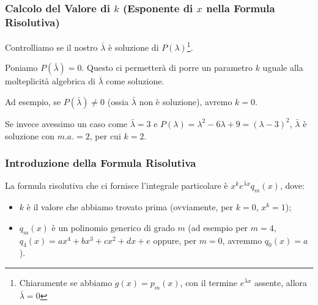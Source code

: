 \documentclass[a4paper,11pt]{article}
\begin{document}
\subsubsection[\texorpdfstring{Calcolo della $k$ di $x^k$}{Calcolo di k da Formula Risolutiva}]{Calcolo del Valore di $k$ (Esponente di $x$ nella Formula Risolutiva)}
Controlliamo se il nostro $\bar{\lambda}$ è soluzione di $P(\lambda)$\footnote[1]{Chiaramente se abbiamo $g(x)=p_m(x)$, con il termine $e^{\bar{\lambda}x}$ assente, allora $\bar{\lambda}=0$}.

\noindent Poniamo $P(\bar{\lambda})=0$. Questo ci permetterà di porre un parametro $k$ uguale alla molteplicità algebrica di $\bar{\lambda}$ come soluzione.

\noindent Ad esempio, se $P(\bar{\lambda})\neq 0$ (ossia $\bar{\lambda}$ non è soluzione), avremo $k=0$.

\noindent Se invece avessimo un caso come $\bar{\lambda}=3$ e $P(\lambda)=\lambda^2-6\lambda+9=(\lambda-3)^2$, $\bar{\lambda}$ è soluzione con $m.a.=2$, per cui $k=2$.

\subsubsection[Formula Risolutiva]{Introduzione della Formula Risolutiva}
La formula risolutiva che ci fornisce l'integrale particolare è $x^k e^{\bar{\lambda} x}q_m(x)$, dove:
\begin{itemize}
    \item $k$ è il valore che abbiamo trovato prima (ovviamente, per $k=0$, $x^k=1$);
    \item $q_m(x)$ è un polinomio generico di grado $m$ (ad esempio per $m=4$, $q_4(x)=ax^4+bx^3+cx^2+dx+e$ oppure, per $m=0$, avremmo $q_0(x)=a$).
\end{itemize}
\end{document}
